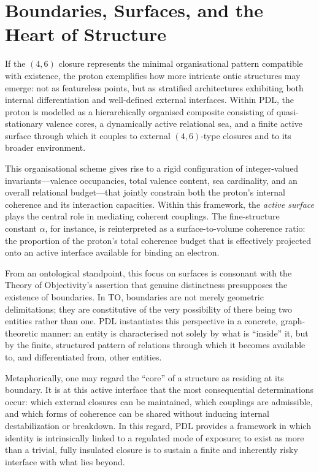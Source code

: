 \documentclass{article}
\theoremstyle{definition}
\newcommand{\PDL}{\ensuremath{\mathrm{PDL}}}
\begin{document}
\section{Boundaries, Surfaces, and the Heart of Structure}
\label{sec:boundaries}

If the \((4,6)\) closure represents the minimal organisational pattern compatible with existence, the proton exemplifies how more intricate ontic structures may emerge: not as featureless points, but as stratified architectures exhibiting both internal differentiation and well-defined external interfaces.
Within \PDL{}, the proton is modelled as a hierarchically organised composite consisting of quasi-stationary valence cores, a dynamically active relational sea, and a finite active surface through which it couples to external \((4,6)\)-type closures and to its broader environment.%
\cite{PDL_Main_2026,PDL_Proton_Architecture_2026_v2}

This organisational scheme gives rise to a rigid configuration of integer-valued invariants—valence occupancies, total valence content, sea cardinality, and an overall relational budget—that jointly constrain both the proton’s internal coherence and its interaction capacities.%
\cite{PDL_Proton_Architecture_2026_v2,PDL_Global_Mapping_2026_v3}
Within this framework, the \emph{active surface} plays the central role in mediating coherent couplings.
The fine-structure constant \(\alpha\), for instance, is reinterpreted as a surface-to-volume coherence ratio: the proportion of the proton’s total coherence budget that is effectively projected onto an active interface available for binding an electron.%
\cite{PDL_Alpha_2026_v2}

From an ontological standpoint, this focus on surfaces is consonant with the Theory of Objectivity’s assertion that genuine distinctness presupposes the existence of boundaries.
In TO, boundaries are not merely geometric delimitations; they are constitutive of the very possibility of there being two entities rather than one.%
\cite{PDL_TO_Dialogue_2026}
\PDL{} instantiates this perspective in a concrete, graph-theoretic manner: an entity is characterised not solely by what is ``inside'' it, but by the finite, structured pattern of relations through which it becomes available to, and differentiated from, other entities.

Metaphorically, one may regard the “core” of a structure as residing at its boundary.
It is at this active interface that the most consequential determinations occur: which external closures can be maintained, which couplings are admissible, and which forms of coherence can be shared without inducing internal destabilization or breakdown.
In this regard, \PDL{} provides a framework in which identity is intrinsically linked to a regulated mode of exposure; to exist as more than a trivial, fully insulated closure is to sustain a finite and inherently risky interface with what lies beyond.%
\cite{PDL_Position_2026,PDL_Global_Mapping_2026_v3}
\end{document}
